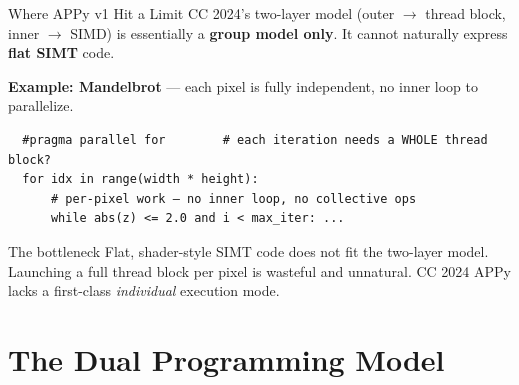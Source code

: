 \documentclass[aspectratio=169]{beamer}
\begin{document}
\begin{frame}[fragile]{Where APPy v1 Hit a Limit}
  CC 2024's two-layer model (outer $\to$ thread block, inner $\to$ SIMD) is essentially
  a \textbf{group model only}. It cannot naturally express \textbf{flat SIMT} code.

  \vspace{0.8em}
  \textbf{Example: Mandelbrot} — each pixel is fully independent, no inner loop to parallelize.

  \begin{verbatim}
  #pragma parallel for        # each iteration needs a WHOLE thread block?
  for idx in range(width * height):
      # per-pixel work — no inner loop, no collective ops
      while abs(z) <= 2.0 and i < max_iter: ...
  \end{verbatim}

  \vspace{0.5em}
  \begin{alertblock}{The bottleneck}
    Flat, shader-style SIMT code does not fit the two-layer model.
    Launching a full thread block per pixel is wasteful and unnatural.
    CC 2024 APPy lacks a first-class \emph{individual} execution mode.
  \end{alertblock}
\end{frame}

\section{The Dual Programming Model}
\end{document}
